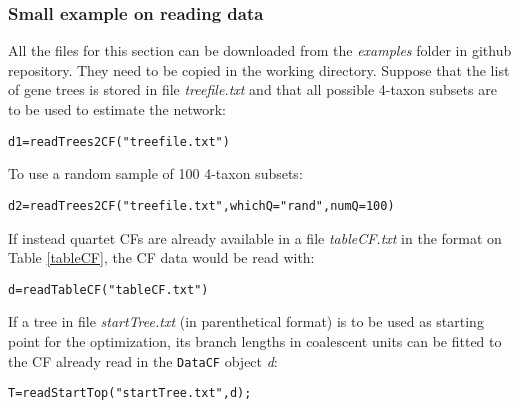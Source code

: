 \documentclass[12pt]{article}
\begin{document}
\begin{itemize}

\end{itemize}

\subsubsection{Small example on reading data}
\label{readDataEx}
All the files for this section can be downloaded from the
\textit{examples} folder in github repository. They need to be copied
in the working directory.  Suppose that the list of gene trees is
stored in file \textit{treefile.txt} and that all possible 4-taxon
subsets are to be used to estimate the network:
\begin{lstlisting}
d1=readTrees2CF("treefile.txt")
\end{lstlisting}
To use a random sample of 100 4-taxon subsets:
\begin{lstlisting}
d2=readTrees2CF("treefile.txt",whichQ="rand",numQ=100)
\end{lstlisting}
If instead quartet CFs are already available in a file
\textit{tableCF.txt} in the format on Table \ref{tableCF}, the CF data
would be read with:
\begin{lstlisting}
d=readTableCF("tableCF.txt")
\end{lstlisting}
If a tree in file \textit{startTree.txt} (in parenthetical format) is
to be used as starting point for the optimization, its branch lengths
in coalescent units can be fitted to the CF already read in the
\texttt{DataCF} object \textit{d}:
\begin{lstlisting}
T=readStartTop("startTree.txt",d);
\end{lstlisting}
\end{document}
